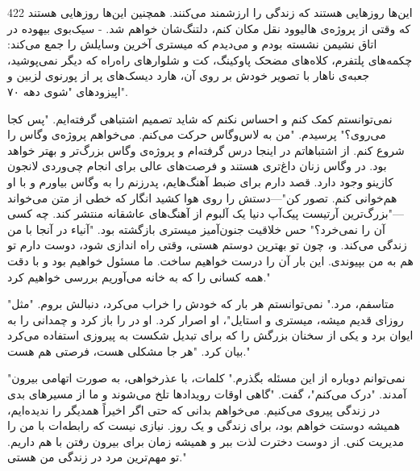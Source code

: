 422
این‌ها روزهایی هستند که زندگی را ارزشمند می‌کنند. همچنین این‌ها روزهایی هستند که وقتی از پروژه‌ی هالیوود نقل مکان کنم، دلتنگ‌شان خواهم شد.
- سیک‌بوی
بیهوده در اتاق نشیمن نشسته بودم و می‌دیدم که میستری آخرین وسایلش را جمع می‌کند: چکمه‌های پلتفرم، کلاه‌های مضحک پاوکینگ، کت و شلوارهای راه‌راه که دیگر نمی‌پوشید، جعبه‌ی ناهار با تصویر خودش بر روی آن، هارد دیسک‌های پر از پورنوی لزبین و اپیزودهای "شوی دهه ۷۰".

نمی‌توانستم کمک کنم و احساس نکنم که شاید تصمیم اشتباهی گرفته‌ایم.
"پس کجا می‌روی؟" پرسیدم.
"من به لاس‌وگاس حرکت می‌کنم. می‌خواهم پروژه‌ی وگاس را شروع کنم. از اشتباهاتم در اینجا درس گرفته‌ام و پروژه‌ی وگاس بزرگ‌تر و بهتر خواهد بود. در وگاس زنان داغ‌تری هستند و فرصت‌های عالی برای انجام چی‌وردی لانجون کازینو وجود دارد. قصد دارم برای ضبط آهنگ‌هایم، پدرزنم را به وگاس بیاورم و با او هم‌خوانی کنم. تصور کن"—دستش را روی هوا کشید انگار که خطی از متن می‌خواند—"بزرگ‌ترین آرتیست پیک‌آپ دنیا یک آلبوم از آهنگ‌های عاشقانه منتشر کند. چه کسی آن را نمی‌خرد؟" حس خلاقیت جنون‌آمیز میستری بازگشته بود. "آنیاء در آنجا با من زندگی می‌کند. و، چون تو بهترین دوستم هستی، وقتی راه اندازی شود، دوست دارم تو هم به من بپیوندی. این بار آن را درست خواهیم ساخت. ما مسئول خواهیم بود و با دقت همه کسانی را که به خانه می‌آوریم بررسی خواهیم کرد."

"متاسفم، مرد." نمی‌توانستم هر بار که خودش را خراب می‌کرد، دنبالش بروم.
"مثل روزای قدیم میشه، میستری و استایل"، او اصرار کرد. او در را باز کرد و چمدانی را به ایوان برد و یکی از سخنان بزرگش را که برای تبدیل شکست به پیروزی استفاده می‌کرد بیان کرد. "هر جا مشکلی هست، فرصتی هم هست."

"نمی‌توانم دوباره از این مسئله بگذرم." کلمات، با عذرخواهی، به صورت اتهامی بیرون آمدند.
"درک می‌کنم"، گفت. "گاهی اوقات رویدادها تلخ می‌شوند و ما از مسیرهای بدی در زندگی پیروی می‌کنیم. می‌خواهم بدانی که حتی اگر اخیراً همدیگر را ندیده‌ایم، همیشه دوستت خواهم بود، برای زندگی و یک روز. نیازی نیست که رابطه‌ات با من را مدیریت کنی. از دوست دخترت لذت ببر و همیشه زمان برای بیرون رفتن با هم داریم. تو مهم‌ترین مرد در زندگی من هستی."